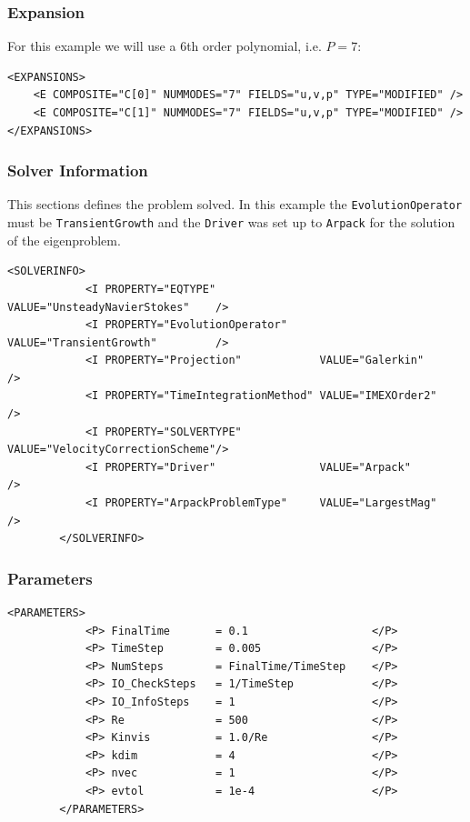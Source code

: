 \subsubsection{Expansion}

For this example we will use a 6th order polynomial, i.e. $P=7$:

      \begin{lstlisting}[style=XMLStyle]
<EXPANSIONS>
    <E COMPOSITE="C[0]" NUMMODES="7" FIELDS="u,v,p" TYPE="MODIFIED" />
    <E COMPOSITE="C[1]" NUMMODES="7" FIELDS="u,v,p" TYPE="MODIFIED" />
</EXPANSIONS>
        \end{lstlisting}

\subsubsection{Solver Information}

This sections defines the problem solved. In this example the \texttt{EvolutionOperator} must be \texttt{TransientGrowth} and the \texttt{Driver} was set up to \texttt{Arpack} for the solution of the eigenproblem.

      \begin{lstlisting}[style=XMLStyle]
 <SOLVERINFO>
            <I PROPERTY="EQTYPE"                VALUE="UnsteadyNavierStokes"    />
            <I PROPERTY="EvolutionOperator"     VALUE="TransientGrowth"         />
            <I PROPERTY="Projection"            VALUE="Galerkin"                />
            <I PROPERTY="TimeIntegrationMethod" VALUE="IMEXOrder2"              />
            <I PROPERTY="SOLVERTYPE"            VALUE="VelocityCorrectionScheme"/>
            <I PROPERTY="Driver"                VALUE="Arpack"                  />
            <I PROPERTY="ArpackProblemType"     VALUE="LargestMag"              />
        </SOLVERINFO>
                \end{lstlisting}


\subsubsection{Parameters}

      \begin{lstlisting}[style=XMLStyle]
<PARAMETERS>
            <P> FinalTime       = 0.1                   </P>
            <P> TimeStep        = 0.005                 </P>
            <P> NumSteps        = FinalTime/TimeStep    </P>
            <P> IO_CheckSteps   = 1/TimeStep            </P>
            <P> IO_InfoSteps    = 1                     </P>
            <P> Re              = 500                   </P>
            <P> Kinvis          = 1.0/Re                </P>
            <P> kdim            = 4                     </P>
            <P> nvec            = 1                     </P>
            <P> evtol           = 1e-4                  </P>
        </PARAMETERS>
                        \end{lstlisting}


